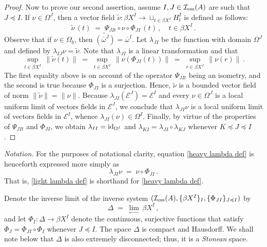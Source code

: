\documentclass{amsart}
\theoremstyle{definition}
\theoremstyle{remark}
\begin{document}
\begin{proof}
Now to prove our second assertion, assume
$I, J\in \mathcal I_{\rm ess}(A)$ are such that $J \preccurlyeq I$.
If $\nu\in\Omega^J$, then a vector field $\tilde\nu:\beta X^I\rightarrow\sqcup_{t\in\beta X^I}H_t^I$ is defined as follows:
\begin{equation}\label{heavy lambda def}
\tilde\nu\,(t)\;=\;\Psi_{JIt}\circ\nu\circ\Phi_{JI}\,(t)\,,\quad t\in\beta X^I\,.
\end{equation}
Observe that if $\nu\in\Omega_b$, then $\tilde{(\overline\omega^J)}=\overline\omega^I$.
Let $\lambda_{JI}$ be the function with domain $\Omega^J$
and defined by $\lambda_{IJ}\nu=\tilde\nu$. Note that $\lambda_{JI}$ is a linear transformation and that
\[
\sup_{t\in\beta X^I}\,\|\tilde\nu(t)\|\;=\; \sup_{t\in\beta X^I}\,\|\nu\left(\Phi_{JI}(t)\right)\|\;=\;\sup_{r\in\beta X^J}\,\|\nu(r)\|\,.
\]
The first equality above is on account of the operator $\Psi_{JIt}$ being an isometry, and the second is true because $\Phi_{JI}$ is a surjection.
Hence, $\tilde\nu$ is a bounded vector field of norm $\|\tilde\nu\|=\|\nu\|$. Because $\lambda_{JI}\left(\mathcal E^J\right)=\mathcal E^I$
and every $\nu\in\Omega^J$ is a local uniform limit of vectors fields in $\mathcal E^J$, we conclude that $\lambda_{JI}\nu$ is a local uniform limit of
vectors fields in $\mathcal E^I$, whence $\lambda_{JI}(\nu)\in\Omega^I$. Finally, by virtue of the properties
of $\Psi_{JIt}$ and $\Phi_{JI}$, we obtain $\lambda_{II}={\rm id}_{\Omega^I}$ and
$\lambda_{KI}=\lambda_{JI}\circ\lambda_{KJ}$ whenever $K \preccurlyeq J \preccurlyeq I$.
\end{proof}

\emph{Notation.} For the purposes of notational clarity, equation \eqref{heavy lambda def} is henceforth expressed more simply as
\begin{equation}\label{light lambda def}
\lambda_{JI}\nu\;=\;\nu\circ\Phi_{JI}\,.
\end{equation}
That is, \eqref{light lambda def} is shorthand for \eqref{heavy lambda def}.

Denote the inverse limit of the  inverse system $( \mathcal I_{\rm ess}(A), \{\beta X^I\}_I, \{\Phi_{JI}\}_{J\preccurlyeq I})$ by
\begin{equation}\label{delta def}
\Delta\;=\;\lim_{\leftarrow}\,\beta X^I\,,
\end{equation}
and let $\Phi_I:\Delta\rightarrow \beta X^I$ denote the continuous, surjective functions that
satisfy $\Phi_J=\Phi_{JI}\circ\Phi_I$ whenever $J\preccurlyeq I$. The space $\Delta$ is compact and Hausdorff. We shall note below that
$\Delta$ is also extremely disconnected;
thus, it is a \emph{Stonean} space.
\end{document}

